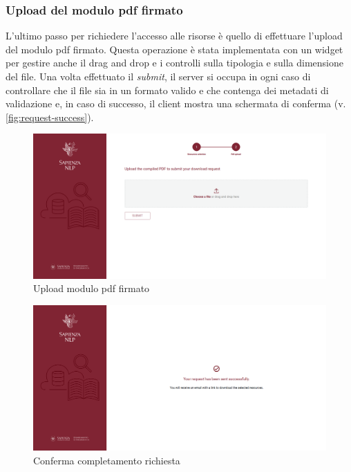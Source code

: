 \subsubsection{Upload del modulo pdf firmato} \label{subsec:pdf-upload}
L'ultimo passo per richiedere l'accesso alle risorse è quello di effettuare
l'upload del modulo pdf firmato. Questa operazione è stata implementata con un
widget per gestire anche il drag and drop e i controlli sulla tipologia e sulla
dimensione del file. Una volta effettuato il \textit{submit}, il server si occupa
in ogni caso di controllare che il file sia in un formato valido e che contenga
dei metadati di validazione e, in caso di successo, il client mostra una
schermata di conferma (v. \autoref{fig:request-success}).

\begin{figure}[H]
	\centering
	\includegraphics[width=\textwidth]{assets/ui/pdf-upload.png}
	\caption{Upload modulo pdf firmato}
	\label{fig:pdf-upload}
\end{figure}

\begin{figure}[H]
	\centering
	\includegraphics[width=\textwidth]{assets/ui/request-success.png}
	\caption{Conferma completamento richiesta}
	\label{fig:request-success}
\end{figure}

